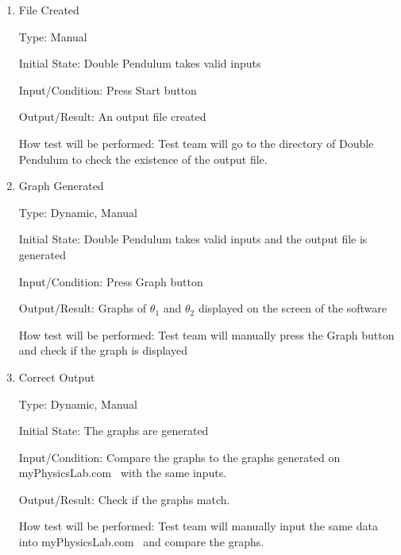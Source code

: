 \documentclass[12pt, titlepage]{article}
\begin{document}
\begin{enumerate}

\item{File Created}  

Type: Manual
          
Initial State: Double Pendulum takes valid inputs
          
Input/Condition: Press Start button
          
Output/Result: An output file created 
          
How test will be performed: Test team will go to the directory of Double
Pendulum to check the existence of the output file. 
          
\item{Graph Generated} 

Type: Dynamic, Manual 
          
Initial State: Double Pendulum takes valid inputs and the output file is
generated
          
Input/Condition: Press Graph button 
          
Output/Result: Graphs of $\theta_1$ and $\theta_2$ displayed on the screen of
the software
          
How test will be performed: Test team will manually press the Graph button and
check if the graph is displayed 

\item{Correct Output}  

Type: Dynamic, Manual 
          
Initial State: The graphs are generated 
          
Input/Condition: Compare the graphs to the graphs generated on
myPhysicsLab.com~\cite{Double_Pendulum} with the same inputs.
          
Output/Result: Check if the graphs match.
          
How test will be performed: Test team will manually input the same data into
myPhysicsLab.com~\cite{Double_Pendulum} and compare the graphs. 

\end{enumerate}

\end{document}
